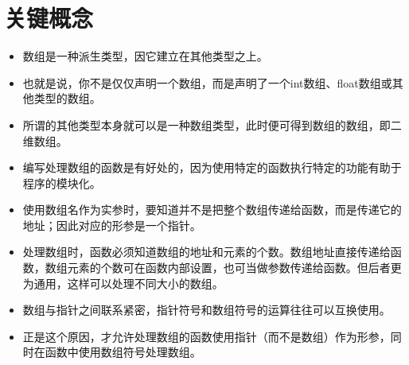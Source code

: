 \section{关键概念}
\begin{frame}[fragile]\ft{\secname}
\begin{itemize}
\item
数组是一种派生类型，因它建立在其他类型之上。\\[0.1in]
\item
也就是说，你不是仅仅声明一个数组，而是声明了一个int数组、float数组或其他类型的数组。\\[0.1in]
\item
所谓的其他类型本身就可以是一种数组类型，此时便可得到数组的数组，即二维数组。
\end{itemize}
\end{frame}

\begin{frame}[fragile]\ft{\secname}
\begin{itemize}
\item
编写处理数组的函数是有好处的，因为使用特定的函数执行特定的功能有助于程序的模块化。\\[0.1in]
\item
\textcolor{acolor1}{使用数组名作为实参时，要知道并不是把整个数组传递给函数，而是传递它的地址；因此对应的形参是一个指针。}\\[0.1in]
\item
处理数组时，函数必须知道数组的地址和元素的个数。数组地址直接传递给函数，数组元素的个数可在函数内部设置，也可当做参数传递给函数。但后者更为通用，这样可以处理不同大小的数组。
\end{itemize}
\end{frame}

\begin{frame}[fragile]\ft{\secname}
\begin{itemize}
\item 数组与指针之间联系紧密，指针符号和数组符号的运算往往可以互换使用。\\[0.1in]
\item 正是这个原因，才允许处理数组的函数使用指针（而不是数组）作为形参，同时在函数中使用数组符号处理数组。
\end{itemize}
\end{frame}
